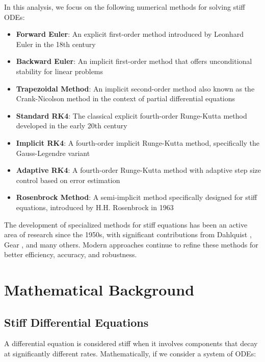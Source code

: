 \documentclass[11pt,a4paper]{article}
\begin{document}
In this analysis, we focus on the following numerical methods for solving stiff ODEs:
\begin{itemize}
    \item \textbf{Forward Euler}: An explicit first-order method introduced by Leonhard Euler in the 18th century \cite{euler1768institutionum}
    \item \textbf{Backward Euler}: An implicit first-order method that offers unconditional stability for linear problems \cite{dahlquist1963special}
    \item \textbf{Trapezoidal Method}: An implicit second-order method also known as the Crank-Nicolson method in the context of partial differential equations \cite{crank1947practical}
    \item \textbf{Standard RK4}: The classical explicit fourth-order Runge-Kutta method developed in the early 20th century \cite{kutta1901beitrag}
    \item \textbf{Implicit RK4}: A fourth-order implicit Runge-Kutta method, specifically the Gauss-Legendre variant \cite{butcher1964implicit}
    \item \textbf{Adaptive RK4}: A fourth-order Runge-Kutta method with adaptive step size control based on error estimation \cite{fehlberg1969low}
    \item \textbf{Rosenbrock Method}: A semi-implicit method specifically designed for stiff equations, introduced by H.H. Rosenbrock in 1963 \cite{rosenbrock1963some}
\end{itemize}

The development of specialized methods for stiff equations has been an active area of research since the 1950s, with significant contributions from Dahlquist \cite{dahlquist1963special}, Gear \cite{gear1971numerical}, and many others. Modern approaches continue to refine these methods for better efficiency, accuracy, and robustness.

\section{Mathematical Background}

\subsection{Stiff Differential Equations}

A differential equation is considered stiff when it involves components that decay at significantly different rates. Mathematically, if we consider a system of ODEs:
\end{document}
